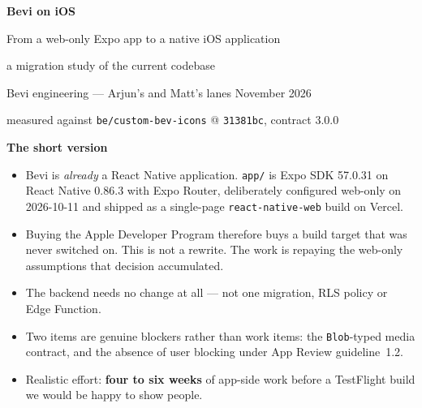 \documentclass[11pt]{article}
\newcommand{\code}[1]{\texttt{\small #1}}
\begin{document}
\begin{center}
  {\color{ink}\Huge\bfseries Bevi on iOS\par}
  \vspace{0.7em}
  {\large From a web-only Expo app to a native iOS application\par}
  \vspace{0.45em}
  {\color{mute}\large a migration study of the current codebase\par}
  \vspace{1.6em}
  {\color{mute}\small Bevi engineering --- Arjun's and Matt's lanes \quad\textbullet{} November 2026\par}
  \vspace{0.3em}
  {\color{mute}\small measured against \code{be/custom-bev-icons} @ \code{31381bc}, contract 3.0.0\par}
\end{center}

\vspace{1.4em}

\begin{callout}
\textbf{\color{ink}The short version}

\begin{itemize}[leftmargin=1.2em,itemsep=0.5em,topsep=0.5em]
  \item Bevi is \emph{already} a React Native application. \code{app/} is Expo SDK 57.0.31 on React
  Native 0.86.3 with Expo Router, deliberately configured web-only on 2026-10-11 and shipped as a
  single-page \code{react-native-web} build on Vercel.
  \item Buying the Apple Developer Program therefore buys a build target that was never switched on.
  This is not a rewrite. The work is repaying the web-only assumptions that decision accumulated.
  \item The backend needs no change at all --- not one migration, RLS policy or Edge Function.
  \item Two items are genuine blockers rather than work items: the \code{Blob}-typed media contract,
  and the absence of user blocking under App Review guideline~1.2.
  \item Realistic effort: \textbf{four to six weeks} of app-side work before a TestFlight build we
  would be happy to show people.
\end{itemize}
\end{callout}

\vspace{0.6em}
\end{document}

